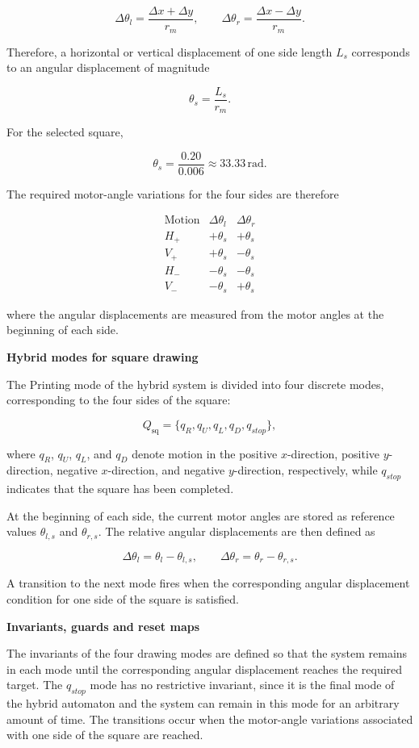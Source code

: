 \documentclass[11pt,a4paper]{article}
\begin{document}
\[
\Delta\theta_l=\frac{\Delta x+\Delta y}{r_m},
\qquad
\Delta\theta_r=\frac{\Delta x-\Delta y}{r_m}.
\]

Therefore, a horizontal or vertical displacement of one side length \(L_s\) corresponds to an
angular displacement of magnitude

\[
\theta_s=\frac{L_s}{r_m}.
\]

For the selected square,

\[
\theta_s=\frac{0.20}{0.006}\approx 33.33\,\mathrm{rad}.
\]

The required motor-angle variations for the four sides are therefore

\[
\begin{array}{c|cc}
\text{Motion} & \Delta\theta_l & \Delta\theta_r \\ \hline
H_+ & +\theta_s & +\theta_s \\
V_+ & +\theta_s & -\theta_s \\
H_- & -\theta_s & -\theta_s \\
V_- & -\theta_s & +\theta_s
\end{array}
\]

where the angular displacements are measured from the motor angles at the beginning of each
side.

\medskip
\noindent\textbf{Hybrid modes for square drawing}

The Printing mode of the hybrid system is divided into four discrete modes, corresponding to
the four sides of the square:

\[
Q_{\mathrm{sq}}=\{q_R, q_U, q_L, q_D, q_{stop}\},
\]

where \(q_R\), \(q_U\), \(q_L\), and \(q_D\) denote motion in the positive \(x\)-direction,
positive \(y\)-direction, negative \(x\)-direction, and negative \(y\)-direction, respectively,
while \(q_{stop}\) indicates that the square has been completed.

At the beginning of each side, the current motor angles are stored as reference values
\(\theta_{l,s}\) and \(\theta_{r,s}\). The relative angular displacements are then defined as

\[
\Delta\theta_l=\theta_l-\theta_{l,s},
\qquad
\Delta\theta_r=\theta_r-\theta_{r,s}.
\]

A transition to the next mode fires when the corresponding angular displacement condition
for one side of the square is satisfied.

\medskip
\noindent\textbf{Invariants, guards and reset maps}

The invariants of the four drawing modes are defined so that the system remains in
each mode until the corresponding angular displacement reaches the required target. The
\(q_{stop}\) mode has no restrictive invariant, since it is the final mode of the hybrid automaton
and the system can remain in this mode for an arbitrary amount of time.
The transitions occur when the motor-angle variations associated with one side of the square
are reached.
\end{document}
